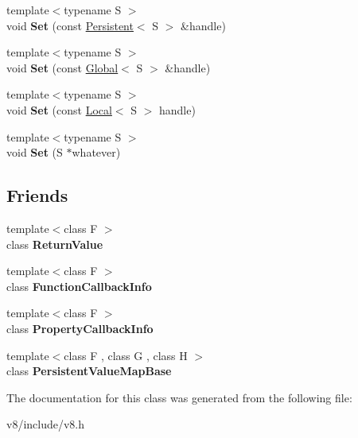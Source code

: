 \begin{DoxyCompactItemize}
\item 
{\footnotesize template$<$typename S $>$ }\\void {\bfseries Set} (const \hyperlink{classv8_1_1Persistent}{Persistent}$<$ S $>$ \&handle)\hypertarget{classv8_1_1ReturnValue_a2ff02f4be7d7fdcf0e21be43dfd4fe43}{}\label{classv8_1_1ReturnValue_a2ff02f4be7d7fdcf0e21be43dfd4fe43}

\item 
{\footnotesize template$<$typename S $>$ }\\void {\bfseries Set} (const \hyperlink{classv8_1_1Global}{Global}$<$ S $>$ \&handle)\hypertarget{classv8_1_1ReturnValue_a57c4b962cf2ca387d3fb9a2f8e47a963}{}\label{classv8_1_1ReturnValue_a57c4b962cf2ca387d3fb9a2f8e47a963}

\item 
{\footnotesize template$<$typename S $>$ }\\void {\bfseries Set} (const \hyperlink{classv8_1_1Local}{Local}$<$ S $>$ handle)\hypertarget{classv8_1_1ReturnValue_a69d99ab0e0c12d68291d425287532799}{}\label{classv8_1_1ReturnValue_a69d99ab0e0c12d68291d425287532799}

\item 
{\footnotesize template$<$typename S $>$ }\\void {\bfseries Set} (S $\ast$whatever)\hypertarget{classv8_1_1ReturnValue_a766f60aa4d7d86bfb949d3c40b147ef7}{}\label{classv8_1_1ReturnValue_a766f60aa4d7d86bfb949d3c40b147ef7}

\end{DoxyCompactItemize}
\subsection*{Friends}
\begin{DoxyCompactItemize}
\item 
{\footnotesize template$<$class F $>$ }\\class {\bfseries Return\+Value}\hypertarget{classv8_1_1ReturnValue_a53f604d3d6f2dc0647df33c9979f116a}{}\label{classv8_1_1ReturnValue_a53f604d3d6f2dc0647df33c9979f116a}

\item 
{\footnotesize template$<$class F $>$ }\\class {\bfseries Function\+Callback\+Info}\hypertarget{classv8_1_1ReturnValue_a76786e6fa2d0eac5e2d4f647659d0d23}{}\label{classv8_1_1ReturnValue_a76786e6fa2d0eac5e2d4f647659d0d23}

\item 
{\footnotesize template$<$class F $>$ }\\class {\bfseries Property\+Callback\+Info}\hypertarget{classv8_1_1ReturnValue_a5018adab21fade2b42f4f60e45fa1083}{}\label{classv8_1_1ReturnValue_a5018adab21fade2b42f4f60e45fa1083}

\item 
{\footnotesize template$<$class F , class G , class H $>$ }\\class {\bfseries Persistent\+Value\+Map\+Base}\hypertarget{classv8_1_1ReturnValue_a08e2b8f164392d71811ce6cc134f33e3}{}\label{classv8_1_1ReturnValue_a08e2b8f164392d71811ce6cc134f33e3}

\end{DoxyCompactItemize}


The documentation for this class was generated from the following file\+:\begin{DoxyCompactItemize}
\item 
v8/include/v8.\+h\end{DoxyCompactItemize}
